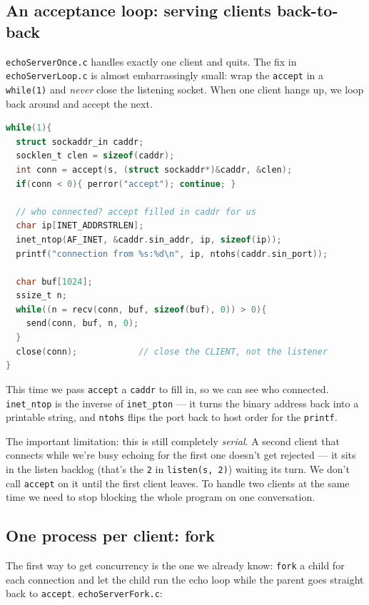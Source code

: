 \documentclass[11pt]{article}
\begin{document}
\subsection*{An acceptance loop: serving clients back-to-back}

\texttt{echoServerOnce.c} handles exactly one client and quits. The
fix in \texttt{echoServerLoop.c} is almost embarrassingly small:
wrap the \texttt{accept} in a \texttt{while(1)} and \emph{never}
close the listening socket. When one client hangs up, we loop back
around and accept the next.

\begin{lstlisting}[language=C]
while(1){
  struct sockaddr_in caddr;
  socklen_t clen = sizeof(caddr);
  int conn = accept(s, (struct sockaddr*)&caddr, &clen);
  if(conn < 0){ perror("accept"); continue; }

  // who connected? accept filled in caddr for us
  char ip[INET_ADDRSTRLEN];
  inet_ntop(AF_INET, &caddr.sin_addr, ip, sizeof(ip));
  printf("connection from %s:%d\n", ip, ntohs(caddr.sin_port));

  char buf[1024];
  ssize_t n;
  while((n = recv(conn, buf, sizeof(buf), 0)) > 0){
    send(conn, buf, n, 0);
  }
  close(conn);            // close the CLIENT, not the listener
}
\end{lstlisting}

This time we pass \texttt{accept} a \texttt{caddr} to fill in, so we
can see who connected. \texttt{inet\_ntop} is the inverse of
\texttt{inet\_pton} --- it turns the binary address back into a
printable string, and \texttt{ntohs} flips the port back to host
order for the \texttt{printf}.

The important limitation: this is still completely \emph{serial}. A
second client that connects while we're busy echoing for the first
one doesn't get rejected --- it sits in the listen backlog (that's
the \texttt{2} in \texttt{listen(s, 2)}) waiting its turn. We don't
call \texttt{accept} on it until the first client leaves. To handle
two clients at the same time we need to stop blocking the whole
program on one conversation.

\subsection*{One process per client: fork}

The first way to get concurrency is the one we already know:
\texttt{fork} a child for each connection and let the child run the
echo loop while the parent goes straight back to \texttt{accept}.
\texttt{echoServerFork.c}:
\end{document}
